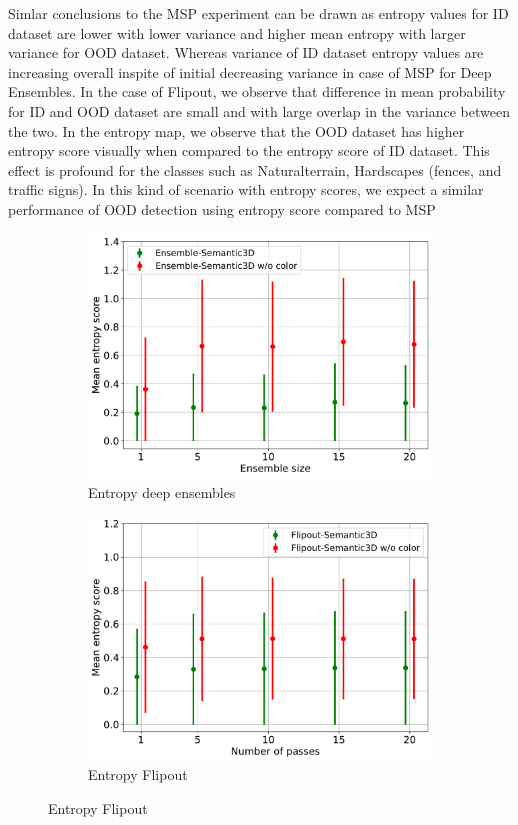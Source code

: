     Simlar conclusions to the MSP experiment can be drawn as entropy values for ID dataset are lower with lower variance and higher mean entropy with larger variance for OOD dataset.
    Whereas variance of ID dataset entropy values are increasing overall inspite of initial decreasing variance in case of MSP for Deep Ensembles.
    In the case of Flipout, we observe that difference in mean probability for ID and OOD dataset are small and with large overlap in the variance between the two.
    In the entropy map, we observe that the OOD dataset has higher entropy score visually when compared to the entropy score of ID dataset.
    This effect is profound for the classes such as Naturalterrain, Hardscapes (fences, and traffic signs).
    In this kind of scenario with entropy scores, we expect a similar performance of OOD detection using entropy score compared to MSP
    \begin{figure}[!ht]
        \centering
        \begin{subfigure}{0.98\textwidth}
        \includegraphics[scale=0.6]{images/MSP/Ensembles_ENT_semvsemwoc.pdf}
        \caption{Entropy deep ensembles}
        \label{fig:ent_ensembles_ood_2}
        \end{subfigure}
        \begin{subfigure}{0.98\textwidth}
        \includegraphics[scale=0.6]{images/MSP/Flipout_ENT_semvsemwoc.pdf}
        \caption{Entropy Flipout}
        \label{fig:ent_flipout_ood_2}
        \end{subfigure}
    \end{figure}
